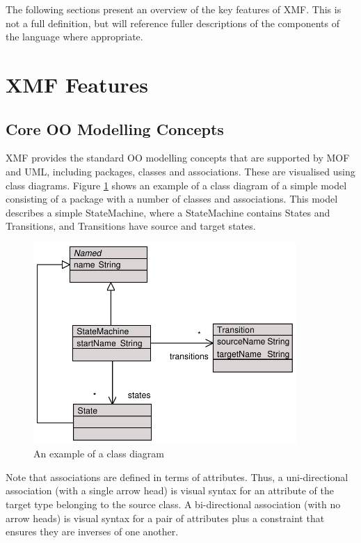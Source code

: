 The following sections present an overview of the key features of
XMF. This is not a full definition, but will reference fuller
descriptions of the components of the language where appropriate.

\section{XMF Features}

\subsection{Core OO Modelling Concepts}
\label{coreconcepts}

XMF provides the standard OO modelling concepts that are supported
by MOF and UML, including packages, classes and associations.
These are visualised using class diagrams. Figure
\ref{classDiagram} shows an example of a class diagram of a simple
model consisting of a package with a number of classes and
associations. This model describes a simple StateMachine, where a
StateMachine contains States and Transitions, and Transitions have
source and target states.

\begin{figure}[htb]
\begin{center}
\includegraphics[width=10cm]{XMF/figures/classdiagramexample}
\caption{An example of a class diagram}
\label{classDiagram}
\end{center}
\end{figure}

Note that associations are defined in terms of attributes. Thus, a
uni-directional association (with a single arrow head) is visual
syntax for an attribute of the target type belonging to the source
class. A bi-directional association (with no arrow heads) is
visual syntax for a pair of attributes plus a constraint that
ensures they are inverses of one another.

